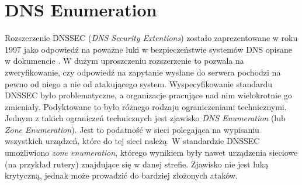 \section{DNS Enumeration}\label{zone_enumeration}
Rozszerzenie DNSSEC (\textit{DNS Security Extentions}) zostało zaprezentowane w roku 1997 \cite{RFC2065} jako odpowiedź na poważne
luki w bezpieczeństwie systemów DNS opisane w dokumencie \cite{DNSsecurityProblem}. W dużym uproszczeniu rozszerzenie to pozwala
na zweryfikowanie, czy odpowiedź na zapytanie wysłane do serwera pochodzi na pewno od niego a nie od atakującego system.
Wyspecyfikowanie standardu DNSSEC było problematyczne, a organizacje pracujące nad nim wielokrotnie go zmieniały. Podyktowane to
było różnego rodzaju ograniczeniami technicznymi. Jednym z takich ograniczeń technicznych jest zjawisko \textit{DNS Enumeration}
(lub \textit{Zone Enumeration}). Jest to podatność w sieci polegająca na wypisaniu wszystkich urządzeń, które do tej sieci należą.
W standardzie DNSSEC umożliwiono \textit{zone enumeration}, którego wynikiem były nawet urządzenia sieciowe (na przykład rutery)
znajdujące się w danej strefie. Zjawisko nie jest luką krytyczną, jednak może prowadzić do bardziej złożonych ataków.

